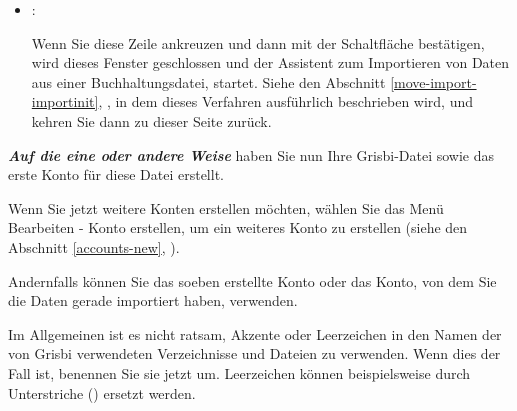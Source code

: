 \begin{enumerate}
\begin{itemize}
		\item[\textopenbullet] :\par%
		Wenn Sie diese Zeile ankreuzen und dann mit der Schaltfläche  bestätigen, wird dieses Fenster geschlossen und der  Assistent zum Importieren von Daten aus einer Buchhaltungsdatei, startet. Siehe den Abschnitt \vref{move-import-importinit}, , in dem dieses Verfahren ausführlich beschrieben wird, und kehren Sie dann zu dieser Seite zurück.%
	\end{itemize}
\end{enumerate}

\label{start-newfile-end}

\textit{\textbf{Auf die eine oder andere Weise}} haben Sie nun Ihre Grisbi-Datei sowie das erste Konto für diese Datei erstellt.%


Wenn Sie jetzt weitere Konten erstellen möchten, wählen Sie das Menü {Bearbeiten - Konto erstellen}, um ein weiteres Konto zu erstellen (siehe den Abschnitt \vref{accounts-new}, ).%


Andernfalls können Sie das soeben erstellte Konto oder das Konto, von dem Sie die Daten gerade importiert haben, verwenden.%

\minisec{\Attention{}}%
Im Allgemeinen ist es nicht ratsam, Akzente oder Leerzeichen in den Namen der von Grisbi verwendeten Verzeichnisse und Dateien zu verwenden. Wenn dies der Fall ist, benennen Sie sie jetzt um. Leerzeichen können beispielsweise durch Unterstriche (\underline{}) ersetzt werden.%

